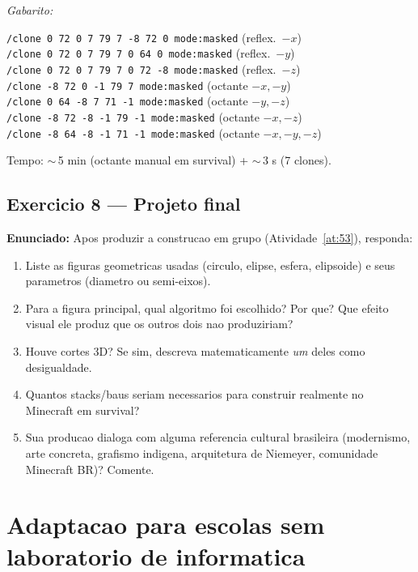 \documentclass[12pt,a4paper]{scrartcl}
\newcommand{\cmd}[1]{\textcolor{earth}{\texttt{\small #1}}}
\begin{document}
\emph{Gabarito:}

\begin{minec}
\cmd{/clone 0 72 0 7 79 7 -8 72 0 mode:masked} \quad (reflex.\ $-x$)\\
\cmd{/clone 0 72 0 7 79 7 0 64 0 mode:masked} \quad\quad (reflex.\ $-y$)\\
\cmd{/clone 0 72 0 7 79 7 0 72 -8 mode:masked} \quad (reflex.\ $-z$)\\
\cmd{/clone -8 72 0 -1 79 7 mode:masked} \quad\quad\;\; (octante $-x,-y$)\\
\cmd{/clone 0 64 -8 7 71 -1 mode:masked} \quad\quad\;\; (octante $-y,-z$)\\
\cmd{/clone -8 72 -8 -1 79 -1 mode:masked} \quad\;\; (octante $-x,-z$)\\
\cmd{/clone -8 64 -8 -1 71 -1 mode:masked} \quad\;\; (octante $-x,-y,-z$)
\end{minec}

Tempo: $\sim$\,5 min (octante manual em survival) + $\sim$\,3 s (7 clones).

\subsection*{Exercicio 8 --- Projeto final}
\textbf{Enunciado:} Apos produzir a construcao em grupo (Atividade~\ref{at:53}), responda:
\begin{enumerate}[label=(\arabic*),leftmargin=1.7em,itemsep=0.15em,topsep=0.2em,nosep]
  \item Liste as figuras geometricas usadas (circulo, elipse, esfera, elipsoide) e seus parametros (diametro ou semi-eixos).
  \item Para a figura principal, qual algoritmo foi escolhido? Por que? Que efeito visual ele produz que os outros dois nao produziriam?
  \item Houve cortes 3D? Se sim, descreva matematicamente \emph{um} deles como desigualdade.
  \item Quantos stacks/baus seriam necessarios para construir realmente no Minecraft em survival?
  \item Sua producao dialoga com alguma referencia cultural brasileira (modernismo, arte concreta, grafismo indigena, arquitetura de Niemeyer, comunidade Minecraft BR)? Comente.
\end{enumerate}

\newpage
\section{Adaptacao para escolas sem laboratorio de informatica}\label{ap:adapt-analog}
\end{document}
